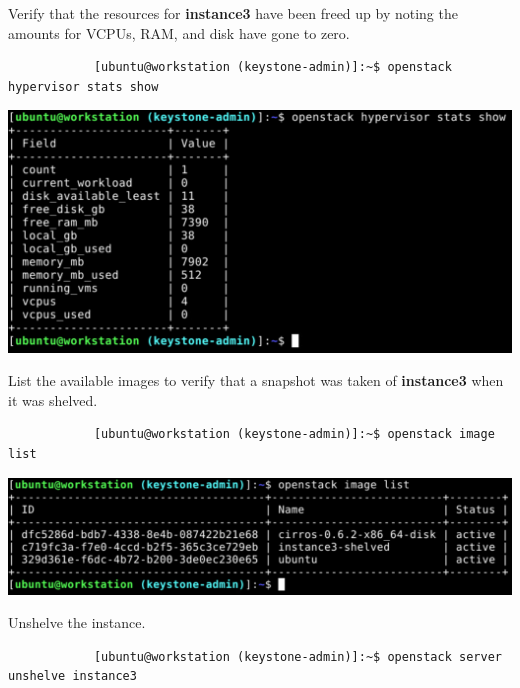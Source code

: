 \documentclass[letterpaper, 12pt]{article}
\begin{document}
\begin{enumerate}
    \begin{labstep}
        Verify that the resources for \textbf{instance3} have been freed up by noting the amounts for VCPUs, RAM, and disk have gone to zero.
        \begin{lstlisting}
            [ubuntu@workstation (keystone-admin)]:~$ openstack hypervisor stats show
        \end{lstlisting}

        \begin{center}
            \includegraphics[width=\linewidth]{images/part6/step9.png}
        \end{center}
    \end{labstep}

    \begin{labstep}
        List the available images to verify that a snapshot was taken of \textbf{instance3} when it was shelved.
        \begin{lstlisting}
            [ubuntu@workstation (keystone-admin)]:~$ openstack image list
        \end{lstlisting}

        \begin{center}
            \includegraphics[width=\linewidth]{images/part6/step10.png}
        \end{center}
    \end{labstep}

    \begin{labstep}
        Unshelve the instance.
        \begin{lstlisting}
            [ubuntu@workstation (keystone-admin)]:~$ openstack server unshelve instance3
        \end{lstlisting}


\end{labstep}
\end{enumerate}
\end{document}
